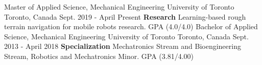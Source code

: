 \begin{cventries}
  \cventry
    {Master of Applied Science, Mechanical Engineering}
    {University of Toronto}
    {Toronto, Canada}
    {Sept. 2019 - April Present}
    {\textbf{Research} Learning-based rough terrain navigation for mobile robots research. GPA (4.0/4.0)}
  \cventry
    {Bachelor of Applied Science, Mechanical Engineering}
    {University of Toronto}
    {Toronto, Canada}
    {Sept. 2013 - April 2018}
    {\textbf{Specialization} Mechatronics Stream and Bioengineering Stream, Robotics and Mechatronics Minor. GPA (3.81/4.00)}
\end{cventries}
